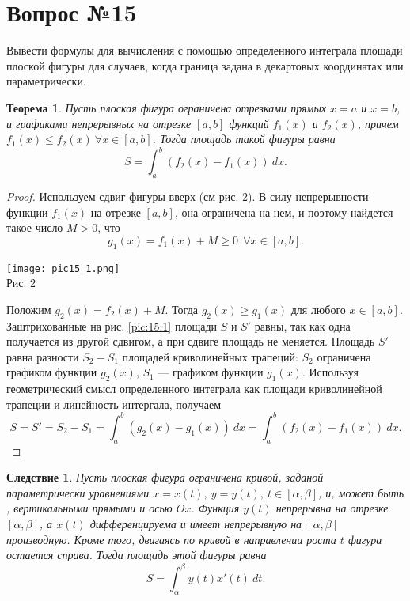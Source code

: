 \documentclass[12pt]{report}
\numberwithin{equation}{section}
\newtheorem{theorem}{Теорема}[section]
\newtheorem{remark}{Следствие}[section]
\begin{document}
\newpage \section{Вопрос №15} %
\begin{framed}
Вывести формулы для вычисления с помощью определенного интеграла площади плоской
фигуры для случаев, когда граница задана в декартовых координатах или параметрически.
\end{framed}

\begin{theorem} \label{th:15:1}
 Пусть плоская фигура ограничена отрезками прямых $x = a$ и $x = b$, и графиками непрерывных на отрезке $[a,b]$ функций $f_1(x)$ и $f_2(x)$, причем $f_1(x) \leqslant f_2(x)~ \forall x \in [a,b]$. Тогда площадь такой фигуры равна
\[S = \int_a^b (f_2(x) - f_1(x))~dx. \]
\end{theorem}
\begin{proof}
Используем сдвиг фигуры вверх (см \hyperref[pic:15:1]{рис. 2}). В силу непрерывности функции $f_1(x)$ на отрезке $[a,b]$, она ограничена на нем, и поэтому найдется такое число $M > 0$, что 
\[ g_1(x) = f_1(x) + M \geqslant 0 ~~ \forall x \in [a,b].\]

\begin{center}
\texttt{[image: pic15\_1.png]} \label{pic:15:1}\\
Рис. 2
\end{center}

Положим $g_2(x) = f_2(x) + M$. Тогда $g_2(x) \geqslant g_1(x)$ для любого $x \in [a,b]$. Заштрихованные на рис. \ref{pic:15:1} площади $S$ и $S'$ равны, так как одна получается из другой сдвигом, а при сдвиге площадь не меняется. Площадь $S'$ равна разности $S_2 - S_1$ площадей криволинейных трапеций: $S_2$ ограничена графиком функции $g_2(x)$, $S_1$ --- графиком функции $g_1(x)$. Используя геометрический смысл определенного интеграла как площади криволинейной трапеции и линейность интергала, получаем
\[ S = S' = S_2 - S_1 = \int_a^b (g_2(x) - g_1(x)) ~dx = \int_a^b (f_2(x) - f_1(x)) ~dx.\]
\end{proof}

\begin{remark} \label {rem:15:1}
Пусть плоская фигура ограничена кривой, заданой параметрически уравнениями $x = x(t),~y = y(t),~t \in [\alpha, \beta]$, и, может быть , вертикальными прямыми и осью $Ox$. Функция $y(t)$ непрерывна на отрезке $[\alpha, \beta]$, а $x(t)$ дифференцируема и имеет непрерывную на $[\alpha, \beta]$ производную. Кроме того, двигаясь по кривой в направлении роста $t$ фигура остается справа. Тогда площадь этой фигуры равна
\[ S = \int_{\alpha}^{\beta} y(t) x'(t)~dt.\]
\end{remark}
\end{document}
